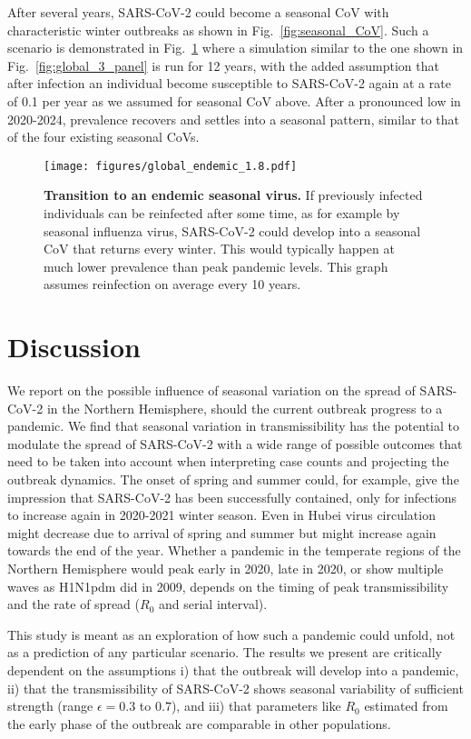 \documentclass[rmp, reprint, superscriptaddress, floatfix,amsmath]{revtex4-1}
\begin{document}
After several years, SARS-CoV-2 could become a seasonal CoV with characteristic winter outbreaks as shown in Fig.~\ref{fig:seasonal_CoV}.
Such a scenario is demonstrated in Fig.~\ref{fig:endemic} where a simulation similar to the one shown in Fig.~\ref{fig:global_3_panel} is run for 12 years, with the added assumption that after infection an individual become susceptible to SARS-CoV-2 again at a rate of 0.1 per year as we assumed for seasonal CoV above. 
After a pronounced low in 2020-2024, prevalence recovers and settles into a seasonal pattern, similar to that of the four existing seasonal CoVs. 

\begin{figure}
    \centering
    \texttt{[image: figures/global\_endemic\_1.8.pdf]}
    \caption{{\bf Transition to an endemic seasonal virus.} 
    If previously infected individuals can be reinfected after some time, as for example by seasonal influenza virus, SARS-CoV-2 could develop into a seasonal CoV that returns every winter. This would typically happen at much lower prevalence than peak pandemic levels. 
    This graph assumes reinfection on average every 10 years.}
    \label{fig:endemic}
\end{figure}

\section{Discussion}

We report on the possible influence of seasonal variation on the spread of SARS-CoV-2 in the Northern Hemisphere, should the current outbreak progress to a pandemic. We find that seasonal variation in transmissibility has the potential to modulate the spread of SARS-CoV-2 with a wide range of possible outcomes that need to be taken into account when interpreting case counts and projecting the outbreak dynamics. 
The onset of spring and summer could, for example, give the impression that SARS-CoV-2 has been successfully contained, only for infections to increase again in 2020-2021 winter season. 
Even in Hubei virus circulation might decrease due to arrival of spring and summer but might increase again towards the end of the year.
Whether a pandemic in the temperate regions of the Northern Hemisphere would peak early in 2020, late in 2020, or show multiple waves as H1N1pdm did in 2009, depends on the timing of peak transmissibility and the rate of spread ($R_0$ and serial interval).

This study is meant as an exploration of how such a pandemic could unfold, not as a prediction of any particular scenario.
The results we present are critically dependent on the assumptions
i) that the outbreak will develop into a pandemic,
ii) that the transmissibility of SARS-CoV-2 shows seasonal variability of sufficient strength (range $\epsilon=0.3$ to $0.7$), and  
iii) that parameters like $R_0$ estimated from the early phase of the outbreak are comparable in other populations. 
\end{document}
